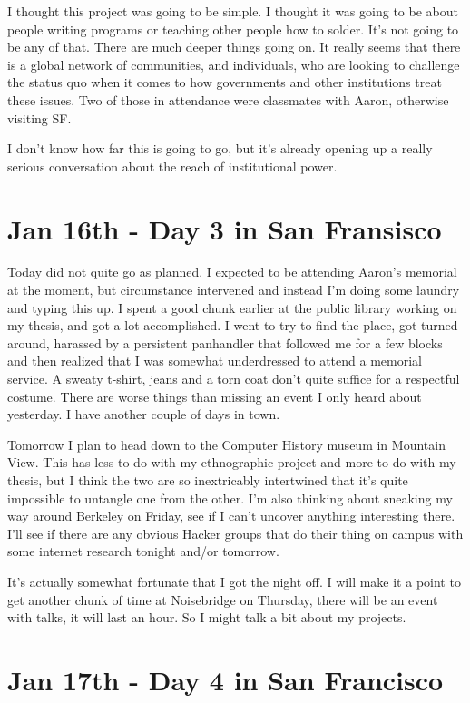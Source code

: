 \documentclass[11pt]{amsart}
\begin{document}
I thought this project was going to be simple. I thought it was going to be about people writing programs or teaching other people how to solder. It's not going to be any of that. There are much deeper things going on. It really seems that there is a global network of communities, and individuals, who are looking to challenge the status quo when it comes to how governments and other institutions treat these issues. Two of those in attendance were classmates with Aaron, otherwise visiting SF.

I don't know how far this is going to go, but it's already opening up a really serious conversation about the reach of institutional power.

\section{Jan 16th - Day 3 in San Fransisco}

Today did not quite go as planned. I expected to be attending Aaron's memorial at the moment, but circumstance intervened and instead I'm doing some laundry and typing this up. I spent a good chunk earlier at the public library working on my thesis, and got a lot accomplished. I went to try to find the place, got turned around, harassed by a persistent panhandler that followed me for a few blocks and then realized that I was somewhat underdressed to attend a memorial service. A sweaty t-shirt, jeans and a torn coat don't quite suffice for a respectful costume. There are worse things than missing an event I only heard about yesterday. I have another couple of days in town.

Tomorrow I plan to head down to the Computer History museum in Mountain View. This has less to do with my ethnographic project and more to do with my thesis, but I think the two are so inextricably intertwined that it's quite impossible to untangle one from the other. I'm also thinking about sneaking my way around Berkeley on Friday, see if I can't uncover anything interesting there. I'll see if there are any obvious Hacker groups that do their thing on campus with some internet research tonight and/or tomorrow.

It's actually somewhat fortunate that I got the night off. I will make it a point to get another chunk of time at Noisebridge on Thursday, there will be an event with talks, it will last an hour. So I might talk a bit about my projects.

\section{Jan 17th - Day 4 in San Francisco}
\end{document}
